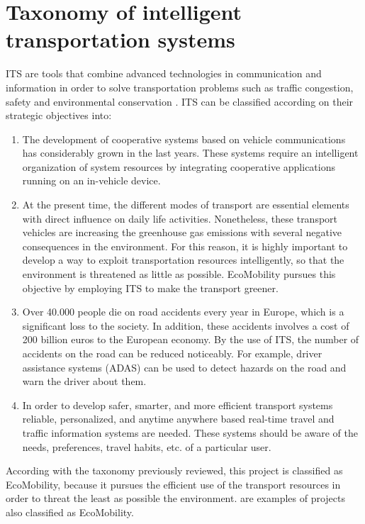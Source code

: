 \section{Taxonomy of intelligent transportation systems}
\ac{ITS} are tools that combine advanced technologies in communication and information in order to solve transportation problems such as traffic congestion, safety and environmental conservation \cite{San15}. \ac{ITS} can be classified according on their strategic objectives \cite{Rafiq201345} into:
\begin{enumerate}
	\item {} The development of cooperative systems based on vehicle communications has considerably grown in the last years. These systems require an intelligent organization of system resources by integrating cooperative applications running on an in-vehicle device.
	
	\item {} At the present time, the different modes of transport are essential elements with direct influence on daily life activities. Nonetheless, these transport vehicles are increasing the greenhouse gas emissions with several negative consequences in the environment. For this reason, it is highly important to develop a way to exploit transportation resources intelligently, so that the environment is threatened as little as possible. EcoMobility pursues this objective by employing \ac{ITS} to make the transport greener.
	
	\item {} Over 40.000 people die on road accidents every year in Europe, which is a significant loss to the society. In addition, these accidents involves a cost of 200 billion euros to the European economy. By the use of \ac{ITS}, the number of accidents on the road can be reduced noticeably. For example, driver assistance systems (ADAS) can be used to detect hazards on the road and warn the driver about them.
	
	\item {} In order to develop safer, smarter, and more efficient transport systems reliable, personalized, and anytime anywhere based real-time travel and traffic information systems are needed. These systems should be aware of the needs, preferences, travel habits, etc. of a particular user.
\end{enumerate}

According with the taxonomy previously reviewed, this project is classified as EcoMobility, because it pursues the efficient use of the transport resources in order to threat the least as possible the environment. \cite{NAVARRO2016314,eCo-MOVe,ADASIS} are examples of projects also classified as EcoMobility.

